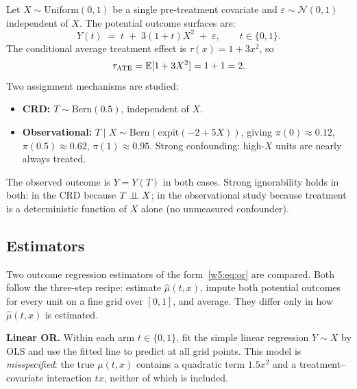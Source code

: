 \documentclass[master.tex]{subfiles}
\begin{document}
\begin{tcolorbox}[defstyle, title={DGP for Lab~5}]
\label{w5:lab:dgp}
Let $X \sim \mathrm{Uniform}(0,1)$ be a single pre-treatment covariate
and $\varepsilon \sim \mathcal{N}(0,1)$ independent of $X$.  The
potential outcome surfaces are:
\begin{equation}
  Y(t) \;=\; t \;+\; 3(1+t)X^2 \;+\; \varepsilon,
  \qquad t \in \{0,1\}.
  \label{w5:lab:dgp-eq}
\end{equation}
The conditional average treatment effect is $\tau(x) = 1 + 3x^2$, so
\begin{equation}
  \tau_{\mathrm{ATE}}
  = \mathbb{E}[1 + 3X^2]
  = 1 + 1 = 2.
  \label{w5:lab:tau}
\end{equation}
Two assignment mechanisms are studied:
\begin{itemize}
  \item \textbf{CRD:}  $T \sim \mathrm{Bern}(0.5)$, independent of $X$.
  \item \textbf{Observational:}  $T \mid X \sim
    \mathrm{Bern}\!\left(\mathrm{expit}(-2 + 5X)\right)$,
    giving $\pi(0) \approx 0.12$, $\pi(0.5) \approx 0.62$,
    $\pi(1) \approx 0.95$.  Strong confounding: high-$X$ units are
    nearly always treated.
\end{itemize}
The observed outcome is $Y = Y(T)$ in both cases.  Strong ignorability
holds in both: in the CRD because $T \perp\!\!\!\perp X$; in the observational
study because treatment is a deterministic function of $X$ alone
(no unmeasured confounder).
\end{tcolorbox}

\subsection*{Estimators}

Two outcome regression estimators of the form~\eqref{w5:eq:or} are
compared.  Both follow the three-step recipe: estimate
$\hat\mu(t,x)$, impute both potential outcomes for every unit on a
fine grid over $[0,1]$, and average.  They differ only in how
$\hat\mu(t,x)$ is estimated.

\medskip
\noindent\textbf{Linear OR.}  Within each arm $t \in \{0,1\}$, fit the
simple linear regression $Y \sim X$ by OLS and use the fitted line to
predict at all grid points.  This model is \emph{misspecified}: the
true $\mu(t,x)$ contains a quadratic term $1.5x^2$ and a
treatment--covariate interaction $tx$, neither of which is included.
\end{document}
